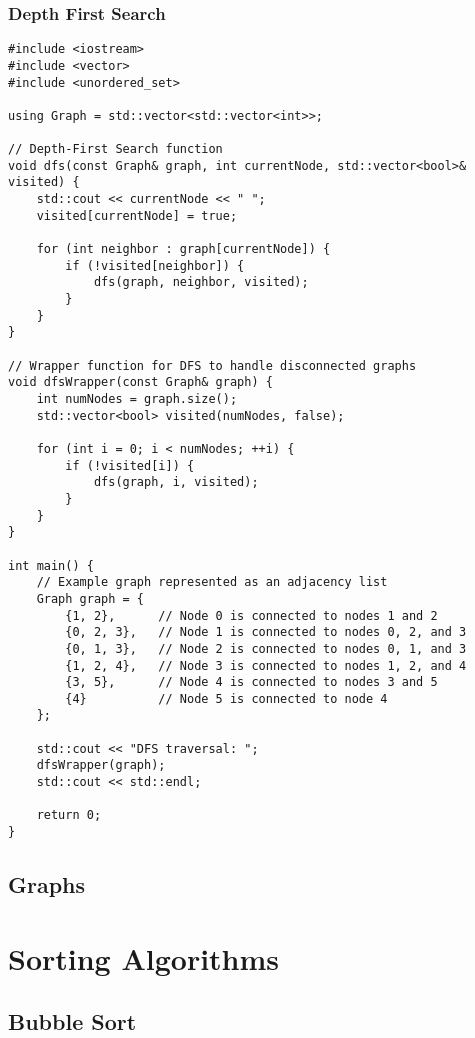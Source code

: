 \documentclass[openany]{report}
\begin{document}
\subsection{Depth First Search}

\begin{verbatim}
#include <iostream>
#include <vector>
#include <unordered_set>

using Graph = std::vector<std::vector<int>>;

// Depth-First Search function
void dfs(const Graph& graph, int currentNode, std::vector<bool>& visited) {
    std::cout << currentNode << " ";
    visited[currentNode] = true;

    for (int neighbor : graph[currentNode]) {
        if (!visited[neighbor]) {
            dfs(graph, neighbor, visited);
        }
    }
}

// Wrapper function for DFS to handle disconnected graphs
void dfsWrapper(const Graph& graph) {
    int numNodes = graph.size();
    std::vector<bool> visited(numNodes, false);

    for (int i = 0; i < numNodes; ++i) {
        if (!visited[i]) {
            dfs(graph, i, visited);
        }
    }
}

int main() {
    // Example graph represented as an adjacency list
    Graph graph = {
        {1, 2},      // Node 0 is connected to nodes 1 and 2
        {0, 2, 3},   // Node 1 is connected to nodes 0, 2, and 3
        {0, 1, 3},   // Node 2 is connected to nodes 0, 1, and 3
        {1, 2, 4},   // Node 3 is connected to nodes 1, 2, and 4
        {3, 5},      // Node 4 is connected to nodes 3 and 5
        {4}          // Node 5 is connected to node 4
    };

    std::cout << "DFS traversal: ";
    dfsWrapper(graph);
    std::cout << std::endl;

    return 0;
}
\end{verbatim}

\section{Graphs}

\chapter{Sorting Algorithms}


\section{Bubble Sort}
\end{document}
